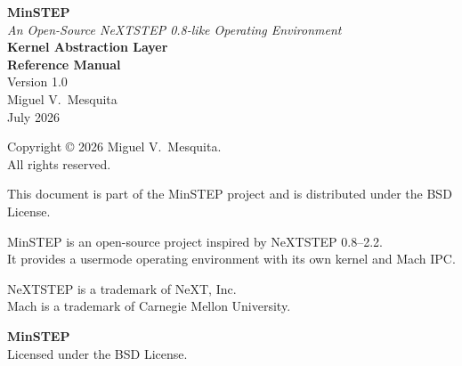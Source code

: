 \documentclass[11pt,twoside]{article}
\begin{document}

\thispagestyle{empty}
\begin{center}
\vspace*{2in}

{\LARGE\bfseries MinSTEP}\\[0.3in]
{\large\itshape An Open-Source NeXTSTEP 0.8-like Operating Environment}\\[0.5in]
{\LARGE\bfseries Kernel Abstraction Layer}\\[0.3in]
{\Large\bfseries Reference Manual}\\[0.8in]
{\large Version 1.0}\\[0.5in]
\vfill
{\large Miguel V.\ Mesquita}\\[0.2in]
{\large July 2026}

\end{center}

\newpage


\thispagestyle{empty}
\vspace*{8in}

\begin{center}
\small
Copyright {\copyright} 2026 Miguel V.\ Mesquita.\\
All rights reserved.

\medskip

This document is part of the MinSTEP project and is distributed
under the BSD License.

\medskip

MinSTEP is an open-source project inspired by NeXTSTEP 0.8--2.2.\\
It provides a usermode operating environment with its own kernel
and Mach IPC.

\medskip

NeXTSTEP is a trademark of NeXT, Inc.\\
Mach is a trademark of Carnegie Mellon University.

\bigskip

{\bf MinSTEP}\\
Licensed under the BSD License.
\end{center}

\newpage
\end{document}
